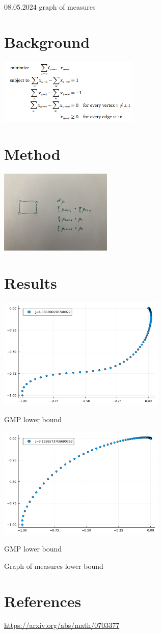 \documentclass{article}
\begin{document}
08.05.2024 graph of measures

\section{Background}
\begin{center}\includegraphics[width=0.5\textwidth]{sp-lp.png}\end{center}

\section{Method}
\begin{center}\includegraphics[width=0.4\textwidth]{spp.JPEG}\end{center}

\section{Results}
\begin{center}\includegraphics[width=0.6\textwidth]{../img/miqp1.pdf}\end{center}
GMP lower bound 
\begin{center}\includegraphics[width=0.6\textwidth]{../img/miqp2.pdf}\end{center}
GMP lower bound 

Graph of measures lower bound 

\section{References}
\url{https://arxiv.org/abs/math/0703377}
\end{document}
